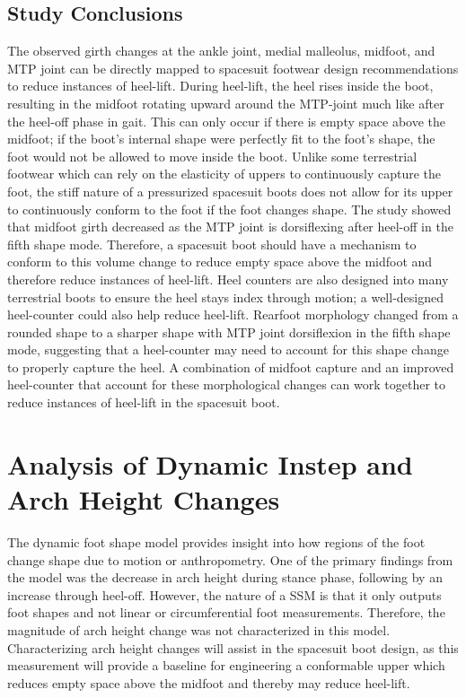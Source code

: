 \documentclass[defaultstyle,11pt]{comps}
\begin{document}
\hypertarget{study-conclusions}{%
\subsection{Study Conclusions}\label{study-conclusions}}

The observed girth changes at the ankle joint, medial malleolus, midfoot, and MTP joint can be directly mapped to spacesuit footwear design recommendations to reduce instances of heel-lift.
During heel-lift, the heel rises inside the boot, resulting in the midfoot rotating upward around the MTP-joint much like after the heel-off phase in gait.
This can only occur if there is empty space above the midfoot; if the boot's internal shape were perfectly fit to the foot's shape, the foot would not be allowed to move inside the boot.
Unlike some terrestrial footwear which can rely on the elasticity of uppers to continuously capture the foot, the stiff nature of a pressurized spacesuit boots does not allow for its upper to continuously conform to the foot if the foot changes shape.
The study showed that midfoot girth decreased as the MTP joint is dorsiflexing after heel-off in the fifth shape mode.
Therefore, a spacesuit boot should have a mechanism to conform to this volume change to reduce empty space above the midfoot and therefore reduce instances of heel-lift.
Heel counters are also designed into many terrestrial boots to ensure the heel stays index through motion; a well-designed heel-counter could also help reduce heel-lift.
Rearfoot morphology changed from a rounded shape to a sharper shape with MTP joint dorsiflexion in the fifth shape mode, suggesting that a heel-counter may need to account for this shape change to properly capture the heel.
A combination of midfoot capture and an improved heel-counter that account for these morphological changes can work together to reduce instances of heel-lift in the spacesuit boot.

\hypertarget{analysis-of-dynamic-instep-and-arch-height-changes}{%
\section{Analysis of Dynamic Instep and Arch Height Changes}\label{analysis-of-dynamic-instep-and-arch-height-changes}}

The dynamic foot shape model provides insight into how regions of the foot change shape due to motion or anthropometry.
One of the primary findings from the model was the decrease in arch height during stance phase, following by an increase through heel-off.
However, the nature of a SSM is that it only outputs foot shapes and not linear or circumferential foot measurements.
Therefore, the magnitude of arch height change was not characterized in this model.
Characterizing arch height changes will assist in the spacesuit boot design, as this measurement will provide a baseline for engineering a conformable upper which reduces empty space above the midfoot and thereby may reduce heel-lift.
\end{document}
